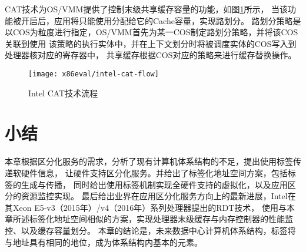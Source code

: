 CAT技术为OS/VMM提供了控制末级共享缓存容量的功能，如图\ref{fig:intel-cat-flow}所示，
当该功能被开启后，应用将只能使用分配给它的Cache容量，实现路划分。
路划分策略是以COS为粒度进行指定，OS/VMM首先为某一COS制定路划分策略，并将该COS关联到使用
该策略的执行实体中，并在上下文划分时将被调度实体的COS写入到处理器核对应的寄存器中，
共享缓存根据COS对应的策略来进行缓存替换操作。

\begin{figure}[H]
  \centering
  \texttt{[image: x86eval/intel-cat-flow]}
  \caption[Intel Cache Allocation Technology (CAT) 技术流程]{Intel CAT技术流程}
  \label{fig:intel-cat-flow}
\end{figure}


\section{小结}

本章根据区分化服务的需求，分析了现有计算机体系结构的不足，提出使用标签传递软硬件信息，
让硬件支持区分化服务。并给出了标签化地址空间方案，包括标签的生成与传播，
同时给出使用标签机制实现全硬件支持的虚拟化，以及应用区分的资源监控实现。
最后给出业界在应用区分化服务方向上的最新进展，Intel在其Xeon E5-v3（2015年）/v4（2016年）系列处理器提出的RDT技术，
使用与本章所述标签化地址空间相似的方案，实现处理器末级缓存与内存控制器的性能监控、以及缓存容量划分。
本章的结论是，未来数据中心计算机体系结构，标签将与地址具有相同的地位，成为体系结构内基本的元素。



